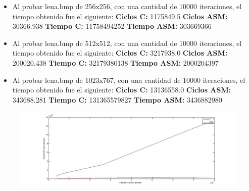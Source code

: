 \documentclass[10pt, a4paper]{article}
\begin{document}
\begin{itemize}
\begin{itemize}
\item{Al probar lena.bmp de 256x256, con una cantidad de 10000 iteraciones, el tiempo obtenido fue el siguiente:\newline
\newline
\textbf{Ciclos C:}                 1175849.5\newline
\vspace{0.15cm}
\textbf{Ciclos ASM:}               30366.938\newline
\textbf{Tiempo C:}                 11758494252\newline
\textbf{Tiempo ASM:}               303669366\newline}

\item{Al probar lena.bmp de 512x512, con una cantidad de 10000 iteraciones, el tiempo obtenido fue el siguiente:\newline
\newline
\textbf{Ciclos C:}                  3217938.0\newline
\vspace{0.15cm}
\textbf{Ciclos ASM:}               200020.438\newline
\textbf{Tiempo C:}                 32179380138\newline
\textbf{Tiempo ASM:}               2000204397\newline}

\item{Al probar lena.bmp de 1023x767, con una cantidad de 10000 iteraciones, el tiempo obtenido fue el siguiente:\newline
\newline
\textbf{Ciclos C:}                 13136558.0\newline
\vspace{0.15cm}
\textbf{Ciclos ASM:}               343688.281\newline
\textbf{Tiempo C:}                 131365579827\newline
\textbf{Tiempo ASM:}               3436882980\newline}

\end{itemize}

\begin{figure}[H] %
\begin{center}
\includegraphics[width=560pt]{./ciclosHalftone.jpg}
\end{center}
\end{figure}


\end{itemize}
\end{document}
